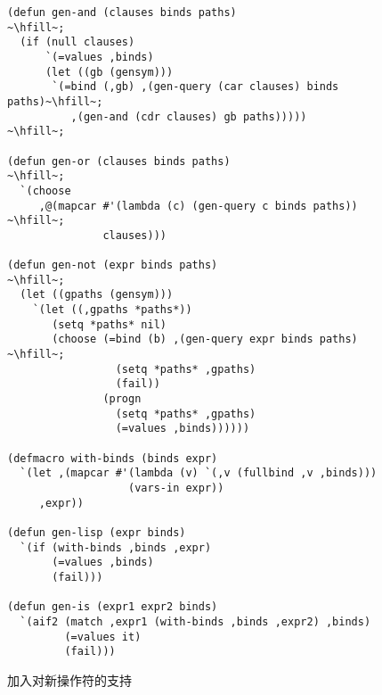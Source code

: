 \begin{figure}
\begin{lstlisting}[escapechar=\~]
(defun gen-and (clauses binds paths)                       ~\hfill~;
  (if (null clauses)
      `(=values ,binds)
      (let ((gb (gensym)))
       `(=bind (,gb) ,(gen-query (car clauses) binds paths)~\hfill~;
          ,(gen-and (cdr clauses) gb paths)))))            ~\hfill~;

(defun gen-or (clauses binds paths)                        ~\hfill~;
  `(choose
     ,@(mapcar #'(lambda (c) (gen-query c binds paths))    ~\hfill~;
               clauses)))

(defun gen-not (expr binds paths)                          ~\hfill~;
  (let ((gpaths (gensym)))
    `(let ((,gpaths *paths*))
       (setq *paths* nil)
       (choose (=bind (b) ,(gen-query expr binds paths)    ~\hfill~;
                 (setq *paths* ,gpaths)
                 (fail))
               (progn
                 (setq *paths* ,gpaths)
                 (=values ,binds))))))

(defmacro with-binds (binds expr)
  `(let ,(mapcar #'(lambda (v) `(,v (fullbind ,v ,binds)))
                   (vars-in expr))
     ,expr))

(defun gen-lisp (expr binds)
  `(if (with-binds ,binds ,expr)
       (=values ,binds)
       (fail)))

(defun gen-is (expr1 expr2 binds)
  `(aif2 (match ,expr1 (with-binds ,binds ,expr2) ,binds)
         (=values it)
         (fail)))
\end{lstlisting}
  \caption{加入对新操作符的支持}
  \label{fig:adding_support_for_new_operators-2}
\end{figure}

